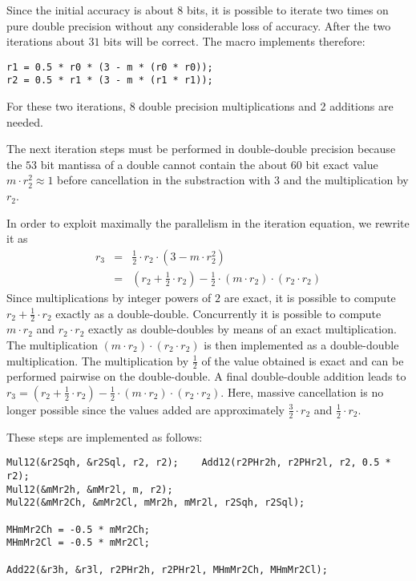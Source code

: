 Since the initial accuracy is about $8$ bits, it is possible to iterate two times on pure double precision 
without any considerable loss of accuracy. After the two iterations about $31$ bits will be correct.
The macro implements therefore:
\begin{lstlisting}[caption={Newton iteration - double precision steps},firstnumber=1]
r1 = 0.5 * r0 * (3 - m * (r0 * r0));
r2 = 0.5 * r1 * (3 - m * (r1 * r1));
\end{lstlisting}
For these two iterations, 8 double precision multiplications and 2 additions are needed.

The next iteration steps must be performed in double-double precision
because the $53$ bit mantissa of a double cannot contain the about
$60$ bit exact value $m \cdot r_2^2 \approx 1$ before cancellation in
the substraction with $3$ and the multiplication by $r_2$.

In order to exploit maximally the parallelism in the iteration equation, we rewrite it as
\begin{eqnarray*}
r_{3} & = & \frac{1}{2} \cdot r_2 \cdot \left( 3 - m \cdot r_2^2 \right) \\
& = & \left( r_2 + \frac{1}{2} \cdot r_2 \right) - \frac{1}{2} \cdot \left( m \cdot r_2 \right) \cdot 
\left( r_2 \cdot r_2 \right)
\end{eqnarray*}
Since multiplications by integer powers of $2$ are exact, it is
possible to compute $r_2 + \frac{1}{2} \cdot r_2$ exactly as a
double-double. Concurrently it is possible to compute $m \cdot r_2$
and $r_2 \cdot r_2$ exactly as double-doubles by means of an exact
multiplication.  The multiplication $\left( m \cdot r_2 \right) \cdot
\left( r_2 \cdot r_2 \right)$ is then implemented as a double-double
multiplication.  The multiplication by $\frac{1}{2}$ of the value
obtained is exact and can be performed pairwise on the
double-double. A final double-double addition leads to $r_3 = \left(
r_2 + \frac{1}{2} \cdot r_2 \right) - \frac{1}{2} \cdot \left( m \cdot
r_2 \right) \cdot \left( r_2 \cdot r_2 \right)$. Here, massive
cancellation is no longer possible since the values added are
approximately $\frac{3}{2} \cdot r_2$ and $\frac{1}{2} \cdot r_2$.

These steps are implemented as follows:
\begin{lstlisting}[caption={Newton iteration - first double-double step},firstnumber=1]
Mul12(&r2Sqh, &r2Sql, r2, r2);    Add12(r2PHr2h, r2PHr2l, r2, 0.5 * r2);
Mul12(&mMr2h, &mMr2l, m, r2);
Mul22(&mMr2Ch, &mMr2Cl, mMr2h, mMr2l, r2Sqh, r2Sql);

MHmMr2Ch = -0.5 * mMr2Ch;
MHmMr2Cl = -0.5 * mMr2Cl;

Add22(&r3h, &r3l, r2PHr2h, r2PHr2l, MHmMr2Ch, MHmMr2Cl);
\end{lstlisting}

